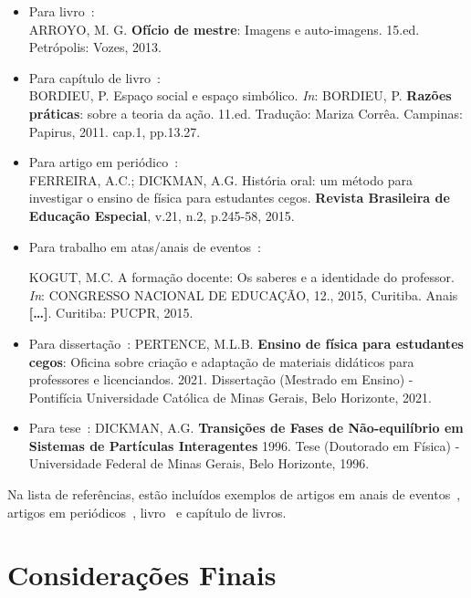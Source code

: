 \documentclass[a4paper,12pt]{article}
\begin{document}
\begin{itemize}
    \item Para livro~\cite{arroyo}: \\

\noindent ARROYO, M. G. {\bf Ofício de mestre}: Imagens e auto-imagens. 15.ed. Petrópolis: Vozes, 2013.

    \item Para capítulo de livro~\cite{bordieu}: \\

\noindent BORDIEU, P. Espaço social e espaço simbólico. {\it In}: BORDIEU, P. {\bf Razões práticas}: sobre a teoria da ação. 11.ed. Tradução: Mariza Corrêa. Campinas: Papirus, 2011. cap.1, pp.13.27.

    \item Para artigo em periódico~\cite{ferreira}: \\
    
\noindent FERREIRA, A.C.; DICKMAN, A.G. História oral: um método para investigar o ensino de física para estudantes cegos. {\bf Revista Brasileira de Educação Especial}, v.21, n.2, p.245-58, 2015.

    \item Para trabalho em atas/anais de eventos~\cite{kogut}:
    
\noindent KOGUT, M.C. A formação docente: Os saberes e a identidade do professor. {\it In}: CONGRESSO NACIONAL DE EDUCAÇÃO, 12., 2015, Curitiba. Anais {\bf […]}. Curitiba: PUCPR, 2015.

\item Para dissertação~\cite{exemplodiss}:
\noindent PERTENCE, M.L.B. {\bf Ensino de física para estudantes cegos}: Oficina sobre criação e adaptação de materiais didáticos para professores e licenciandos. 2021. Dissertação (Mestrado em Ensino) - Pontifícia Universidade Católica de Minas Gerais, Belo Horizonte, 2021.

\item Para tese~\cite{exemplotese}:
\noindent DICKMAN, A.G. {\bf Transições de Fases de Não-equilíbrio em Sistemas de Partículas Interagentes} 1996. Tese (Doutorado em Física) - Universidade Federal de Minas Gerais, Belo Horizonte, 1996.
\end{itemize}

Na lista de referências, estão incluídos exemplos de artigos em anais de eventos~\cite{ponciano2017designing}, artigos em periódicos~\cite{ponciano2018agreement}, livro~\cite{swokowski1994} e capítulo de livros.

\section{Considerações Finais}
\label{sec:con}
\end{document}
